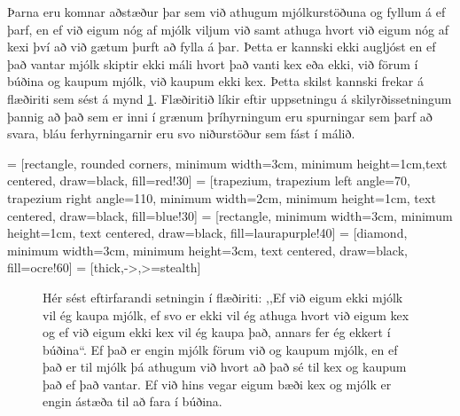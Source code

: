 Þarna eru komnar aðstæður þar sem við athugum mjólkurstöðuna og fyllum á ef þarf, en ef við eigum nóg af mjólk viljum við samt athuga hvort við eigum nóg af kexi því að við gætum þurft að fylla á þar.
Þetta er kannski ekki augljóst en ef það vantar mjólk skiptir ekki máli hvort það vanti kex eða ekki, við förum í búðina og kaupum mjólk, við kaupum ekki kex.
Þetta skilst kannski frekar á flæðiriti sem sést á mynd \ref{fig:flæðirit}.
Flæðiritið líkir eftir uppsetningu á skilyrðissetningum þannig að það sem er inni í grænum þríhyrningum eru spurningar sem þarf að svara, bláu ferhyrningarnir eru svo niðurstöður sem fást í málið.

 = [rectangle, rounded corners, minimum width=3cm, minimum height=1cm,text centered, draw=black, fill=red!30]
 = [trapezium, trapezium left angle=70, trapezium right angle=110, minimum width=2cm, minimum height=1cm, text centered, draw=black, fill=blue!30]
 = [rectangle, minimum width=3cm, minimum height=1cm, text centered, draw=black, fill=laurapurple!40]
 = [diamond, minimum width=3cm, minimum height=3cm, text centered, draw=black, fill=ocre!60]
 = [thick,->,>=stealth]

\vspace{5pt}
\begin{figure}[H]
	\centering
{}
\caption{Hér sést eftirfarandi setningin í flæðiriti: ,,Ef við eigum ekki mjólk vil ég kaupa mjólk, ef svo er ekki vil ég athuga hvort við eigum kex og ef við eigum ekki kex vil ég kaupa það, annars fer ég ekkert í búðina“. Ef það er engin mjólk förum við og kaupum mjólk, en ef það er til mjólk þá athugum við hvort að það sé til kex og kaupum það ef það vantar.
Ef við hins vegar eigum bæði kex og mjólk er engin ástæða til að fara í búðina.}
\label{fig:flæðirit}
\end{figure}

